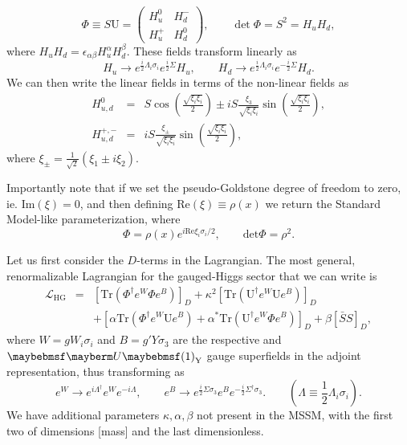 \begin{equation}
\Phi\equiv S\text{U}=
\begin{pmatrix} H_{u}^{0}  &  H_{d}^{-}\\
H_{u}^{+} & H_{d}^{0}
\end{pmatrix},
\qquad
\det\Phi= S^2 = H_u H_d,
\end{equation}
where $H_u H_d = \epsilon_{\alpha\beta}H^{\alpha}_u H^{\beta}_d$. These fields transform linearly as
\begin{equation}
H_u \rightarrow e^{\frac{i}{2}\Lambda_{i}\sigma_{i}}e^{\frac{i}{2}\Sigma}H_u,\qquad H_d \rightarrow e^{\frac{i}{2}\Lambda_{i}\sigma_{i}}e^{-\frac{i}{2}\Sigma}H_d.
\end{equation}
We can then write the linear fields in terms of the non-linear fields as
\begin{eqnarray}
H^0_{u,d}&=& S \cos \left( \frac{\sqrt{\xi_i \xi_i}}{2}\right) \pm iS \frac{\xi_3}{\sqrt{\xi_i \xi_i}} \sin \left( \frac{\sqrt{\xi_i \xi_i}}{2}\right), \\
H^{+,-}_{u,d}&=& iS \frac{\xi_{\pm}}{\sqrt{\xi_i \xi_i}} \sin \left( \frac{\sqrt{\xi_i \xi_i}}{2}\right),
\end{eqnarray}
where $\xi_{\pm}=\frac{1}{\sqrt{2}}(\xi_1 \pm i\xi_2)$.

Importantly note that if we set the pseudo-Goldstone degree of freedom to zero, ie. $\text{Im}(\xi)=0$, and then defining $\text{Re}(\xi) \equiv \rho(x)$ we return the Standard Model-like parameterization, where
\begin{equation}
\Phi = \rho(x) e^{i\text{Re}\xi_i \sigma_i/2},\qquad \text{det} \Phi=\rho^2.
\end{equation}

Let us first consider the $D$-terms in the Lagrangian. The most general, renormalizable Lagrangian for the gauged-Higgs sector that we can write is
\begin{eqnarray}
\mathcal{L}_{\text{HG}}	&=&	\left[\text{Tr}\left(\Phi^{\dagger}e^{W}\Phi e^{B}\right)\right]_{D}+\kappa^{2}\left[\text{Tr}\left(\text{U}^{\dagger}e^{W}\text{U}e^{B}\right)\right]_{D} \nonumber \\ 
	&&+\left[\alpha \text{Tr}\left(\Phi^{\dagger}e^{W}\text{U}e^{B}\right)+\alpha^{*}\text{Tr}\left(\text{U}^{\dagger}e^{W}\Phi e^{B}\right)\right]_{D} +\beta \left[\bar{S}S\right]_{D},
\label{eqn:nonlinearlag}
\end{eqnarray}
where $W=gW_i\sigma_i$ and $B=g'Y\sigma_{3}$ are the respective  and $\Ugroup{1}_{\text{Y}}$ gauge superfields in the adjoint representation, thus transforming as
\begin{equation}
e^W \rightarrow e^{i\Lambda^{\dagger}} e^W e^{-i\Lambda}, \qquad e^B \rightarrow e^{\frac{i}{2}\Sigma \sigma_3} e^B e^{-\frac{i}{2}\Sigma^{\dagger}\sigma_3}. \qquad \left( \Lambda \equiv \frac{1}{2}\Lambda_i\sigma_i \right).
\end{equation}
We have additional parameters $\kappa,\alpha,\beta$ not present in the MSSM, with the first two of dimensions [mass] and the last dimensionless.

